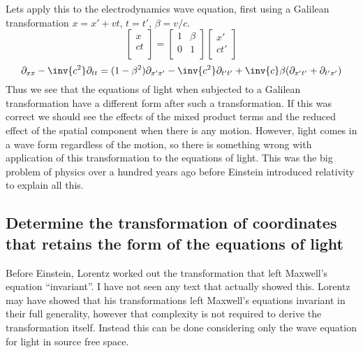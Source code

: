 Lets apply this to the electrodynamics wave equation, first using a Galilean transformation \(x = x' + v t\), \(t = t'\), \(\beta = v/c\).
%
\begin{equation}
\begin{bmatrix}
x \\
ct \\
\end{bmatrix}
=
\begin{bmatrix}
1 & \beta \\
0 & 1 \\
\end{bmatrix}
\begin{bmatrix}
x' \\
c t' \\
\end{bmatrix}
\end{equation}
%
\begin{equation}
\partial_{xx} -\inv{c^2}\partial_{tt} =
(1 - \beta^2)\partial_{x'x'}
-\inv{c^2}\partial_{t't'}
+\inv{c}\beta( \partial_{x't'} + \partial_{t'x'} )
\end{equation}
%
Thus we see that the equations of light when subjected to a Galilean transformation have a different form after such a
transformation.  If this was correct we should see the effects of the mixed product terms and the reduced effect of the
spatial component when there is any motion.  However, light comes in a wave form regardless of the motion, so there
is something wrong with application of this transformation to the equations of light.  This was the big problem of physics
over a hundred years ago before Einstein introduced relativity to explain all this.

\subsection{Determine the transformation of coordinates that retains the form of the equations of light}

Before Einstein, Lorentz worked out the transformation that left Maxwell's equation ``invariant''.  I have not seen
any text that actually showed this.  Lorentz may have showed that his transformations left Maxwell's equations
invariant in their full generality, however that complexity is not required to derive the transformation itself.  Instead
this can be done considering only the wave equation for light in source free space.

